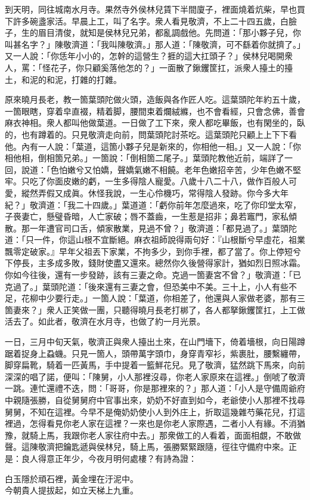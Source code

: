 到天明，同往城南水月寺。果然寺外侯林兒賃下半間廈子，{}裡面燒着炕柴，早也買下許多碗盞家活。早晨上工，叫了名字。衆人看見敬濟，不上二十四五歲，白臉子，生的眉目清俊，就知是侯林兒兄弟，都亂調戲他。先問道：「那小夥子兒，你叫甚名字？」陳敬濟道：「我叫陳敬濟。」那人道：「陳敬濟，可不繇着你就擠了。」又一人說：「你恁年小小的，怎幹的這營生？捱的這大扛頭子？」{}侯林兒喝開衆人，罵：「怪花子，你只顧奚落他怎的？」一面散了鍬钁筐扛，派衆人擡土的擡土，和泥的和泥，打雜的打雜。

原來曉月長老，教一箇葉頭陀做火頭，造飯與各作匠人吃。這葉頭陀年約五十歲，一箇眼瞎，穿着皁直裰，精着脚，腰間束着爛絨縧，也不會看經，只會念佛，善會麻衣神相。衆人都叫他做葉道。一日做了工下來，衆人都吃畢飯，也有閑坐的，臥的，也有蹲着的。{}只見敬濟走向前，問葉頭陀討茶吃。這葉頭陀只顧上上下下看他。內有一人說：「葉道，這箇小夥子兒是新來的，你相他一相。」又一人說：「你相他相，倒相箇兄弟。」一箇說：「倒相箇二尾子。」葉頭陀教他近前，端詳了一回，說道：「色怕嫩兮又怕嬌，聲嬌氣嫩不相饒。老年色嫩招辛苦，少年色嫩不堅牢。只吃了你面皮嫩的虧，一生多得陰人寵愛。八歲十八二十八，做作百般人可愛，縱然弄假又成眞。休怪我說，一生心伶機巧，常得陰人發跡。你今多大年紀？」敬濟道：「我二十四歲。」葉道道：「虧你前年怎麼過來，吃了你印堂太窄，子䘮妻亡，懸璧昏暗，人亡家破；唇不蓋齒，一生惹是招非；鼻若竈門，家私傾散。那一年遭官司口舌，傾家散業，見過不曾？」敬濟道：「都見過了。」葉頭陀道：「只一件，你這山根不宜斷絕。麻衣祖師說得兩句好：『山根斷兮早虛花，祖業飄零定破家。』早年父祖丟下家業，不拘多少，到你手裡，都了當了。你上停短兮下停長，主多成多敗，錢財使盡又還來。總然你久後營得家計，猶如烈日照冰霜。你如今往後，還有一步發跡，該有三妻之命。克過一箇妻宮不曾？」敬濟道：「已克過了。」葉頭陀道：「後來還有三妻之會，但恐美中不美。三十上，小人有些不足，花柳中少要行走。」一箇人說：「葉道，你相差了，他還與人家做老婆，那有三箇妻來？」衆人正笑做一團，只聽得曉月長老打梆了，各人都拏鍬钁筐扛，上工做活去了。如此者，敬濟在水月寺，也做了約一月光景。

一日，三月中旬天氣，敬濟正與衆人擡出土來，在山門墻下，倚着墻根，向日陽蹲踞着捉身上蝨蟣。只見一箇人，頭帶萬字頭巾，身穿青窄衫，紫裹肚，腰繫纏帶，脚穿扁靴，騎着一匹黃馬，手中提着一籃鮮花兒。{}見了敬濟，猛然跳下馬來，向前深深的唱了諾，便叫：「陳舅，小人那裡沒尋，你老人家原來在這裡。」倒唬了敬濟一跳。連忙還禮不迭，問：「哥哥，你是那裡來的？」那人道：「小人是守備周爺府中親隨張勝，自從舅舅府中官事出來，奶奶不好直到如今，老爺使小人那裡不找尋舅舅，不知在這裡。今早不是俺奶奶使小人到外庄上，折取這幾雜芍藥花兒，打這裡過，怎得看見你老人家在這裡？一來也是你老人家際遇，二者小人有緣。不消猶豫，就騎上馬，我跟你老人家往府中去。」那衆做工的人看着，面面相覷，不敢做聲。{}這陳敬濟把鑰匙遞與侯林兒，騎上馬，張勝緊緊跟隨，徑往守備府中來。正是：良人得意正年少，今夜月明何處樓？有詩為證：

\begin{myquote}
白玉隱於頑石裡，黃金埋在汙泥中。\\今朝貴人提拔起，如立天梯上九重。
\end{myquote}


